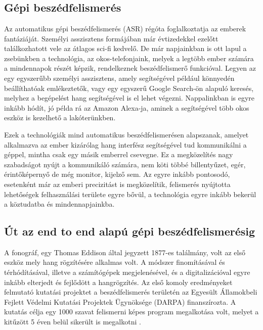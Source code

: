 \chapter{\bevezetes}

\section{Gépi beszédfelismerés}

Az automatikus gépi beszédfelismerés (ASR) régóta foglalkoztatja az emberek fantáziáját. Személyi asszisztens formájában már évtizedekkel ezelőtt találkozhatott vele az átlagos sci-fi kedvelő. De már napjainkban is ott lapul a zsebünkben a technológia, az okos-telefonjaink, melyek a legtöbb ember számára a mindennapok részét képzik, rendelkeznek beszédfelismerő funkcióval. Legyen az egy egyszerűbb személyi asszisztens, amely segítségével például könnyedén beállíthatóak emlékeztetők, vagy egy egyszerű Google Search-ön alapuló keresés, melyhez a begépelést hang segítségével is el lehet végezni. Nappalinkban is egyre inkább hódít, jó példa rá az Amazon Alexa-ja, aminek a segítségével több okos eszköz is kezelhető a lakóterünkben.

Ezek a technológiák mind automatikus beszédfelismerésen alapszanak, amelyet alkalmazva az ember kizárólag hang interfész segítségével tud kommunikálni a géppel, mintha csak egy másik emberrel csevegne. Ez a megközelítés nagy szabadságot nyújt a kommunikáló számára, nem köti többé billentyűzet, egér, érintőképernyő de még monitor, kijelző sem. Az egyre inkább pontosodó, esetenként már az emberi precizitást is megközelítik\cite{forbes}, felismerés nyújtotta lehetőségek felhasználási területe egyre bővül, a technológia egyre inkább bekerül a köztudatba és mindennapjainkba.

\section{Út az end to end alapú gépi beszédfelismerésig}

A fonográf, egy Thomas Eddison által jegyzett 1877-es találmány, volt az első eszköz mely hang rögzítésére alkalmas volt. A módszer finomításával és térhódításával,  illetve a számítógépek megjelenésével, és a digitalizációval egyre inkább elterjedt és fejlődött a hangrögzítés. Az első komoly eredményeket felmutató kutatási projektet a beszédfelismerés területén az Egyesült Államokbeli Fejlett Védelmi Kutatási Projektek Ügynöksége (DARPA) finanszírozta. A kutatás célja egy 1000 szavat felismerni képes program megalkotása volt, melyet a kitűzött 5 éven belül sikerült is megalkotni \cite{tortenelem}.

